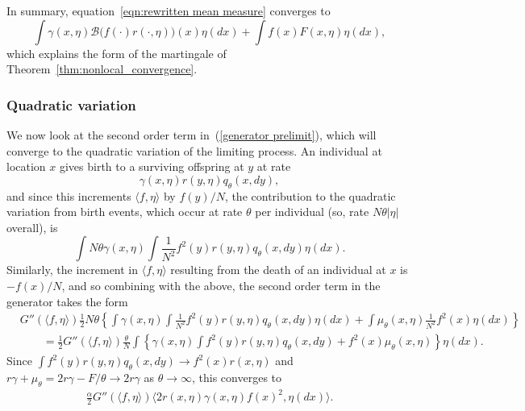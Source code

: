 \documentclass[EJP]{ejpecp} %
\newcommand{\DG}{\mathcal{B}}  %
\begin{document}
In summary, equation~\eqref{eqn:rewritten mean measure} converges to
\begin{equation} \label{limit of mean measure equation}
\int \gamma(x,\eta)
\DG \big(f(\cdot)r(\cdot,\eta)\big)(x)
\eta(dx)
+
\int f(x)
F(x,\eta)
\eta(dx) ,
\end{equation}
which explains the form of the martingale of Theorem~\ref{thm:nonlocal_convergence}.


\subsubsection*{Quadratic variation}


We now look at the second order term in~(\ref{generator prelimit}),
which will converge to the quadratic variation of the limiting process.
An individual at location $x$ gives birth 
to a surviving offspring at $y$ at rate
$$
\gamma(x,\eta) r(y,\eta) q_{\theta}(x, dy) ,
$$
and since this increments $\langle f, \eta \rangle$ by $f(y) / N$,
the contribution to the quadratic variation from birth events,
which occur at rate $\theta$ per individual 
(so, rate $N\theta |\eta|$ overall), is
$$
\int
    N \theta \gamma(x,\eta)
    \int \frac{1}{N^2} f^2(y) r(y,\eta)
    q_\theta(x,dy) 
\eta(dx) .
$$
Similarly, the increment in $\langle f, \eta\rangle$ resulting from 
the death of an individual at $x$ is $-f(x)/N$, and so combining with the 
above, the second order term in the generator takes the form
\begin{align*}
& G''(\langle f,\eta\rangle)
\frac{1}{2} N \theta
\left\{
    \int
        \gamma(x,\eta)
        \int \frac{1}{N^2}f^2(y)r(y,\eta)q_\theta(x,dy) 
    \eta(dx)
    +
    \int
        \mu_\theta(x,\eta)\frac{1}{N^2}f^2(x) 
    \eta(dx)
\right\} \\
&\qquad
= \frac{1}{2} G''(\langle f, \eta \rangle)
    \frac{\theta}{N}
	\int\left\{
		\gamma(x, \eta) \int f^2(y) r(y, \eta) q_\theta(x, dy) + f^2(x) \mu_\theta(x, \eta)
    \right\} \eta(dx) .
\end{align*}
Since $\int f^2(y) r(y, \eta) q_\theta(x, dy) \to f^2(x) r(x, \eta)$
and $r\gamma  + \mu_\theta = 2 r \gamma  - F / \theta \to 2 r \gamma$
as $\theta \to \infty$,
this converges to
\begin{align*}
\frac{\alpha}{2} G''(\langle f, \eta \rangle)
    \big\langle
    2 r(x, \eta) \gamma(x, \eta) f(x)^2,
        \eta(dx)
    \big\rangle .
\end{align*}
\end{document}
